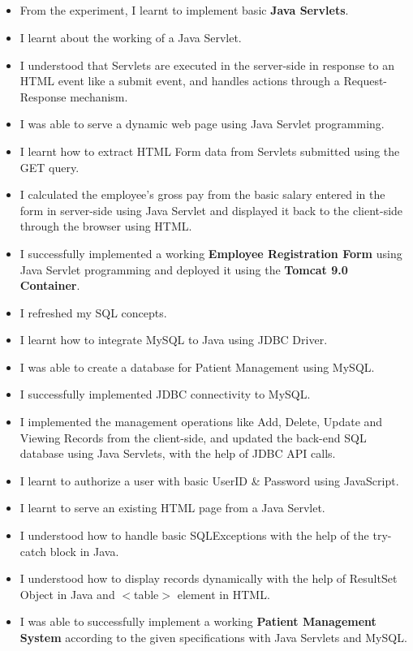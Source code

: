 \documentclass[12pt, a4]{article}
\begin{document}
\newpage
\subsection*{}
\begin{itemize}

\item From the experiment, I learnt to implement basic \textbf{Java Servlets}.
\item I learnt about the working of a Java Servlet.
\item I understood that Servlets are executed in the server-side in response to an HTML event like a submit event, and handles actions through a Request-Response mechanism.
\item I was able to serve a dynamic web page using Java Servlet programming.
\item I learnt how to extract HTML Form data from Servlets submitted using the GET query.
\item I calculated the employee's gross pay from the basic salary entered in the form in server-side using Java Servlet and displayed it back to the client-side through the browser using HTML.
\item I successfully implemented a working \textbf{Employee Registration Form} using Java Servlet programming and deployed it using the \textbf{Tomcat 9.0 Container}.
\item I refreshed my SQL concepts.
\item I learnt how to integrate MySQL to Java using JDBC Driver.
\item I was able to create a database for Patient Management using MySQL.
\item I successfully implemented JDBC connectivity to MySQL.
\item I implemented the management operations like Add, Delete, Update and Viewing Records from the client-side, and updated the back-end SQL database using Java Servlets, with the help of JDBC API calls.
\item I learnt to authorize a user with basic UserID \& Password using JavaScript. 
\item I learnt to serve an existing HTML page from a Java Servlet.
\item I understood how to handle basic SQLExceptions with the help of the try-catch block in Java.
\item I understood how to display records dynamically with the help of ResultSet Object in Java and $<$table$>$ element in HTML.
\item I was able to successfully implement a working \textbf{Patient Management System} according to the given specifications with Java Servlets and MySQL.

\end{itemize}
\end{document}
